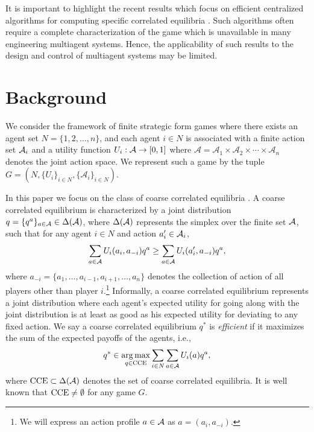 It is important to highlight the recent results which focus on efficient centralized algorithms for computing specific correlated equilibria \cite{Jiang2011, Papadimitriou2008, Ortiz}.  Such algorithms often require  a complete characterization of the game which is unavailable in many engineering multiagent systems.  Hence, the applicability of such results to the design and control of multiagent systems may be limited.  


\section{Background}

We consider the framework of finite strategic form games where there exists an agent set $N = \{1, 2, \dots, n\}$, and each agent $i \in N$ is associated with a finite action set ${\cal A}_i$ and a utility function $U_i : {\cal A} \rightarrow [0,1]$ where $\mathcal{A} = \mathcal{A}_1\times\mathcal{A}_2\times\cdots\times \mathcal{A}_n$ denotes the joint action space. %
%
%
We  represent such a game by the tuple $G = \left (N,\{U_i\}_{i\in N},\{\mathcal{A}_i\}_{i\in N}\right)$.

In this paper we focus on the class of coarse correlated equilibria \cite{Aumann1987}.  A coarse correlated equilibrium is characterized by a joint distribution $q = \{q^a\}_{a \in {\cal A}} \in \Delta({\cal A})$, where $\Delta({\cal A})$ represents the simplex over the finite set ${\cal A}$, such that for any agent $i \in N$ and action $a_i' \in {\cal A}_i$,
%
\begin{equation} 
\sum_{a \in {\cal A}} U_i(a_i, a_{-i}) q^a \geq \sum_{a \in {\cal A}} U_i(a_i', a_{-i}) q^a, 
\end{equation}
%
where $a_{-i} = \{a_1, \dots, a_{i-1}, a_{i+1}, \dots, a_n\}$ denotes the collection of action of all players other than player $i$.\footnote{We will express an action profile $a \in {\cal A}$ as $a=(a_i, a_{-i})$.}  Informally, a coarse correlated equilibrium represents a joint distribution where each agent's expected utility for going along with the joint distribution is at least as good as his expected utility for deviating to any fixed action.  We say a coarse correlated equilibrium $q^*$ is \emph{efficient} if it maximizes the sum of the expected payoffs of the agents, i.e., 
%
\begin{equation}
%
q^* \in \underset{q \in {\rm CCE}}{\arg \max} \sum_{i \in N} \sum_{a \in \aee} U_i(a) q^a,
%
\end{equation}  
%
where ${\rm CCE} \subset \Delta({\cal A})$ denotes the set of coarse correlated equilibria.  It is well known that ${\rm CCE} \neq \emptyset$ for any game $G$.

